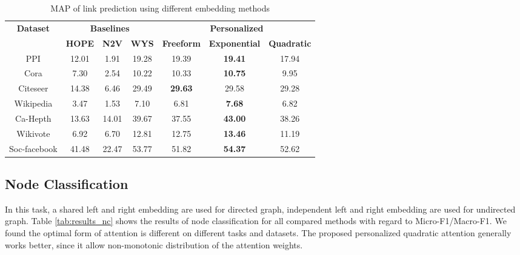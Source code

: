 \documentclass{article}
\begin{document}
\begin{table}
\caption{MAP of link prediction using different embedding methods}
\label{tab:results_lp}
\centering
\begin{tabular}{cccc|ccc}
\toprule
\multirow{2}{*}{\textbf{Dataset}} & \multicolumn{3}{c}{\textbf{Baselines}} & \multicolumn{3}{c}{\textbf{Personalized}} \\
 & \textbf{HOPE} & \textbf{N2V} & \textbf{WYS} & \textbf{Freeform} & \textbf{Exponential} & \textbf{Quadratic}\\
\midrule
PPI & 12.01  & 1.91 & 19.28 & 19.39 & \textbf{19.41} & 17.94\\
Cora & 7.30  & 2.54 & 10.22 & 10.33 & \textbf{10.75} & 9.95\\
Citeseer & 14.38  & 6.46  & 29.49 & \textbf{29.63} & 29.58 & 29.28 \\
Wikipedia & 3.47  & 1.53  & 7.10 & 6.81 & \textbf{7.68} & 6.82\\
Ca-Hepth & 13.63  & 14.01  & 39.67 & 37.55 & \textbf{43.00} & 38.26\\
Wikivote & 6.92  & 6.70  & 12.81 & 12.75 & \textbf{13.46} & 11.19\\
Soc-facebook & 41.48  & 22.47 & 53.77 & 51.82 & \textbf{54.37} & 52.62\\

\bottomrule
\end{tabular}
\end{table}



\subsection{Node Classification}
In this task, a shared left and right embedding are used for directed graph, independent left and right embedding are used for undirected graph.
Table \ref{tab:results_nc} shows the results of node classification for all compared methods with regard to Micro-F1/Macro-F1.
We found the optimal form of attention is different on different tasks and datasets. The proposed personalized quadratic attention generally works better, since it allow non-monotonic distribution of the attention weights.
\end{document}
